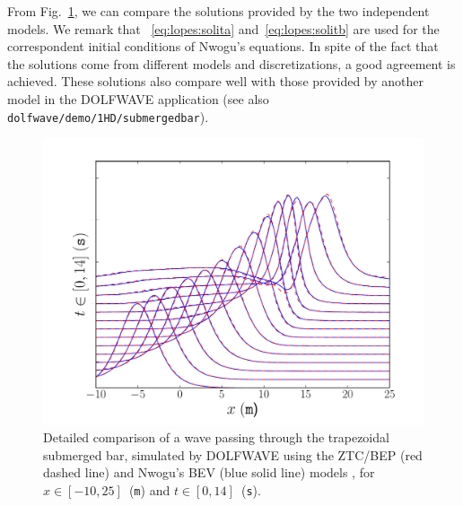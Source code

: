 From Fig.~\ref{fig:lopes:zhaonwogu}, we can compare the
solutions provided by the two independent models.  We remark
that ~\eqref{eq:lopes:solita}
and~\eqref{eq:lopes:solitb} are used for the correspondent initial
conditions of Nwogu's equations.
In spite of the fact that  the solutions come from different
models and discretizations, a good agreement  is achieved.
These solutions also compare well with those provided by
another model in the DOLFWAVE application (see also {\tt
  dolfwave/demo/1HD/submergedbar}).

 \begin{figure}
 \begin{center}
 \includegraphics[width=\largefig]{chapters/lopes/pdf/ZhaoNwogu.pdf}
 \end{center}
 \caption{Detailed comparison of a wave passing through the
 trapezoidal submerged bar,
simulated by DOLFWAVE  using the ZTC/BEP (red dashed line) and
 Nwogu's BEV (blue solid line) models , for
  $x\in[-10,25]$~({\tt m}) and $t\in[0,14]$~({\tt s}).}
 \label{fig:lopes:zhaonwogu}
 \end{figure}


